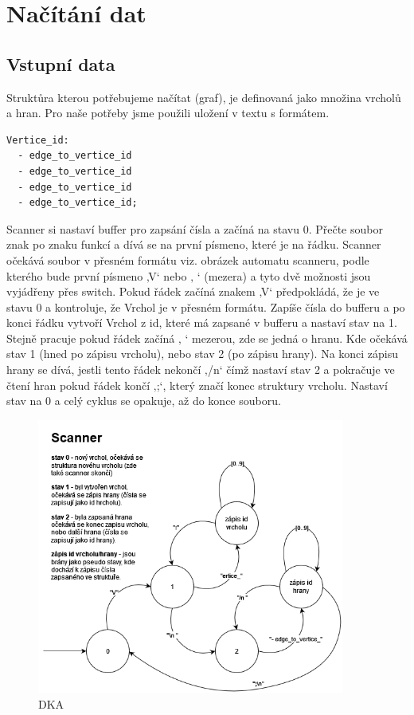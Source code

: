 \section{Načítání dat}

\subsection{Vstupní data}
Struktůra kterou potřebujeme načítat (graf), je definovaná jako množina vrcholů a hran. Pro naše potřeby
jsme použili uložení v textu s formátem.

\begin{lstlisting}
Vertice_id:
  - edge_to_vertice_id
  - edge_to_vertice_id
  - edge_to_vertice_id
  - edge_to_vertice_id;
\end{lstlisting}

Scanner si nastaví buffer pro zapsání čísla a začíná na stavu 0. Přečte soubor znak po znaku funkcí a dívá se na první písmeno, které je na řádku. Scanner očekává soubor v přesném formátu viz. obrázek automatu scanneru, podle kterého bude první písmeno ‚V‘ nebo ‚ ‘ (mezera) a tyto dvě možnosti jsou vyjádřeny přes switch. Pokud řádek začíná znakem ‚V‘ předpokládá, že je ve stavu 0 a kontroluje, že Vrchol je v přesném formátu. Zapíše čísla do bufferu a po konci řádku vytvoří Vrchol z id, které má zapsané v bufferu a nastaví stav na 1. Stejně pracuje pokud řádek začíná ‚ ‘ mezerou, zde se jedná o hranu. Kde očekává stav 1 (hned po zápisu vrcholu), nebo stav 2 (po zápisu hrany). Na konci zápisu hrany se dívá, jestli tento řádek nekončí ‚/n‘ čímž nastaví stav 2 a pokračuje ve čtení hran pokud řádek končí ‚;‘, který značí konec struktury vrcholu. Nastaví stav na 0 a celý cyklus se opakuje, až do konce souboru.

\begin{figure}[h]
    \centering
    \includegraphics[width=0.9\textwidth]{doc/fig/Scanner_automat_Final.drawio.png}
    \caption{DKA}
    \label{fig:DKA}
\end{figure}


\newpage
